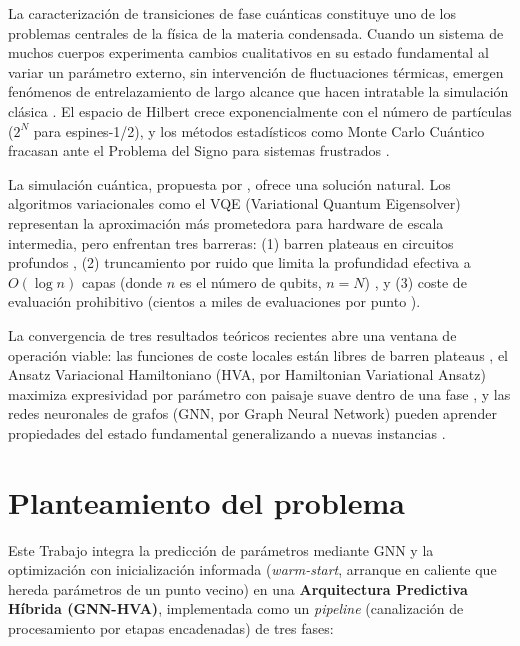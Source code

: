 \documentclass[11pt,a4paper,spanish]{book}
\begin{document}
La caracterización de transiciones de fase cuánticas constituye uno de los problemas centrales de la física de la materia condensada. Cuando un sistema de muchos cuerpos experimenta cambios cualitativos en su estado fundamental al variar un parámetro externo, sin intervención de fluctuaciones térmicas, emergen fenómenos de entrelazamiento de largo alcance que hacen intratable la simulación clásica \citep{dutta2015, anderson1972}. El espacio de Hilbert crece exponencialmente con el número de partículas ($2^N$ para espines-1/2), y los métodos estadísticos como Monte Carlo Cuántico fracasan ante el Problema del Signo para sistemas frustrados \citep{troyer2005}.

La simulación cuántica, propuesta por \citet{feynman1982}, ofrece una solución natural. Los algoritmos variacionales como el VQE (Variational Quantum Eigensolver) \citep{peruzzo2014} representan la aproximación más prometedora para hardware de escala intermedia, pero enfrentan tres barreras: (1) barren plateaus en circuitos profundos \citep{mcclean2018, cerezo2021}, (2) truncamiento por ruido que limita la profundidad efectiva a $O(\log n)$ capas (donde $n$ es el número de qubits, $n = N$) \citep{mele2026}, y (3) coste de evaluación prohibitivo (cientos a miles de evaluaciones por punto \citep{tilly2022}).

La convergencia de tres resultados teóricos recientes abre una ventana de operación viable: las funciones de coste locales están libres de barren plateaus \citep{cerezo2021}, el Ansatz Variacional Hamiltoniano (HVA, por Hamiltonian Variational Ansatz) maximiza expresividad por parámetro con paisaje suave dentro de una fase \citep{wiersema2020, mele2022, puig2025}, y las redes neuronales de grafos (GNN, por Graph Neural Network) pueden aprender propiedades del estado fundamental generalizando a nuevas instancias \citep{huang2022, miao2024, zhang2025}.

\section{Planteamiento del problema}

Este Trabajo integra la predicción de parámetros mediante GNN \citep{miao2024, zhang2025} y la optimización con inicialización informada (\emph{warm-start}, arranque en caliente que hereda parámetros de un punto vecino) \citep{puig2025} en una \textbf{Arquitectura Predictiva Híbrida (GNN-HVA)}, implementada como un \emph{pipeline} (canalización de procesamiento por etapas encadenadas) de tres fases:
\end{document}
